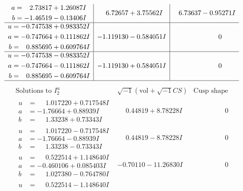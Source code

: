 \documentclass[1p]{elsarticle_modified}
\theoremstyle{definition}
\newcommand{\I}{\sqrt{-1}}
\begin{document}
$$\begin{array}{c|c|c}
\begin{aligned}
a &= \phantom{-}2.73817 + 1.26087 I \\
b &= -1.46519 - 0.13406 I\end{aligned}
 & \phantom{-}6.72657 + 3.75562 I & \phantom{-}6.73637 - 0.95271 I \\ \hline\begin{aligned}
u &= -0.747538 + 0.983352 I \\
a &= -0.747664 + 0.111862 I \\
b &= \phantom{-}0.885695 + 0.609764 I\end{aligned}
 & -1.119130 - 0.584051 I & \phantom{-0.000000 } 0 \\ \hline\begin{aligned}
u &= -0.747538 - 0.983352 I \\
a &= -0.747664 - 0.111862 I \\
b &= \phantom{-}0.885695 - 0.609764 I\end{aligned}
 & -1.119130 + 0.584051 I & \phantom{-0.000000 } 0\\
 \hline 
 \end{array}$$\newpage$$\begin{array}{c|c|c}  
\text{Solutions to }I^u_{2}& \I (\text{vol} + \sqrt{-1}CS) & \text{Cusp shape}\\
 \hline 
\begin{aligned}
u &= \phantom{-}1.017220 + 0.717548 I \\
a &= -1.76664 + 0.88939 I \\
b &= \phantom{-}1.33238 + 0.73343 I\end{aligned}
 & \phantom{-}0.44819 + 8.78228 I & \phantom{-0.000000 } 0 \\ \hline\begin{aligned}
u &= \phantom{-}1.017220 - 0.717548 I \\
a &= -1.76664 - 0.88939 I \\
b &= \phantom{-}1.33238 - 0.73343 I\end{aligned}
 & \phantom{-}0.44819 - 8.78228 I & \phantom{-0.000000 } 0 \\ \hline\begin{aligned}
u &= \phantom{-}0.522514 + 1.148640 I \\
a &= -0.460106 + 0.085403 I \\
b &= \phantom{-}1.027380 - 0.764780 I\end{aligned}
 & -0.70110 - 11.26830 I & \phantom{-0.000000 } 0 \\ \hline\begin{aligned}
u &= \phantom{-}0.522514 - 1.148640 I \\

\end{aligned}
\end{array}$$
\end{document}
